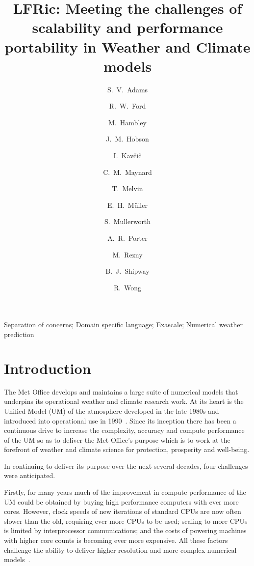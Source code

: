 \documentclass[review,times]{elsarticle}
\begin{document}
\begin{frontmatter}

\title{LFRic: Meeting the challenges of scalability and performance portability in Weather and Climate models}

\author[met]{S.~V.~Adams}
\author[hartree]{R.~W.~Ford}
\author[met]{M.~Hambley}
\author[met]{J.~M.~Hobson}
\author[met]{I.~Kav\v ci\v c}
\author[met,read]{C.~M.~Maynard}
\author[met]{T.~Melvin}
\author[bath]{E.~H.~M\"{u}ller}
\author[met]{S.~Mullerworth}
\author[hartree]{A.~R.~Porter}
\author[monash]{M.~Rezny}
\author[met]{B.~J.~Shipway}
\author[met]{R.~Wong}


\address[met]{Met Office, UK}
\address[hartree]{STFC Hartree Centre, Daresbury Laboratory, UK}
\address[read]{Department of Computer Science, Polly Vacher Building,
  University of Reading, UK}
\address[bath]{Department of Mathematics, University of Bath, UK}
\address[monash]{Monash University, Melbourne, Australia}

\begin{abstract}
\end{abstract}

\begin{keyword}
Separation of concerns; Domain specific language; Exascale; Numerical weather prediction
\end{keyword}

\end{frontmatter}


\newpage
\section{\label{sec:intro}Introduction}

The Met Office develops and maintains a large suite of numerical
models that underpins its operational weather and climate research
work. At its heart is the Unified Model (UM) of the atmosphere
developed in the late 1980s and introduced into operational use in
1990~\cite{gmd-10-1487-2017}. Since its inception there has been a
continuous drive to increase the complexity, accuracy and compute
performance of the UM so as to deliver the Met Office's purpose which
is to work at the forefront of weather and climate science for
protection, prosperity and well-being.

In continuing to deliver its purpose over the next several decades,
four challenges were anticipated.

Firstly, for many years much of the improvement in compute performance
of the UM could be obtained by buying high performance computers with
ever more cores. However, clock speeds of new iterations of standard
CPUs are now often slower than the old, requiring ever more CPUs to be
used; scaling to more CPUs is limited by interprocessor
communications; and the costs of powering machines with higher core
counts is becoming ever more expensive. All these factors challenge
the ability to deliver higher resolution and more complex numerical
models~\cite{gmd-2017-186}.
\end{document}
